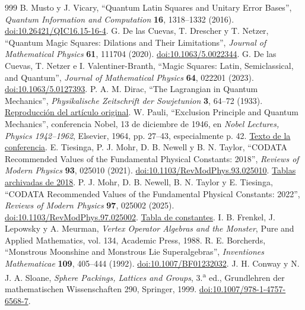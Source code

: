 \begin{thebibliography}{999}
 B. Musto y J. Vicary, ``Quantum Latin Squares and Unitary Error Bases'', \emph{Quantum Information and Computation} \textbf{16}, 1318--1332 (2016). \href{https://doi.org/10.26421/QIC16.15-16-4}{doi:10.26421/QIC16.15-16-4}.
 G. De las Cuevas, T. Drescher y T. Netzer, ``Quantum Magic Squares: Dilations and Their Limitations'', \emph{Journal of Mathematical Physics} \textbf{61}, 111704 (2020). \href{https://doi.org/10.1063/5.0022344}{doi:10.1063/5.0022344}.
 G. De las Cuevas, T. Netzer e I. Valentiner-Branth, ``Magic Squares: Latin, Semiclassical, and Quantum'', \emph{Journal of Mathematical Physics} \textbf{64}, 022201 (2023). \href{https://doi.org/10.1063/5.0127393}{doi:10.1063/5.0127393}.
 P. A. M. Dirac, ``The Lagrangian in Quantum Mechanics'', \emph{Physikalische Zeitschrift der Sowjetunion} \textbf{3}, 64--72 (1933). \href{https://www.informationphilosopher.com/solutions/scientists/dirac/Lagrangian_1933.pdf}{Reproducción del artículo original}.
 W. Pauli, ``Exclusion Principle and Quantum Mechanics'', conferencia Nobel, 13 de diciembre de 1946, en \emph{Nobel Lectures, Physics 1942--1962}, Elsevier, 1964, pp. 27--43, especialmente p. 42. \href{https://www.nobelprize.org/uploads/2018/06/pauli-lecture.pdf}{Texto de la conferencia}.
 E. Tiesinga, P. J. Mohr, D. B. Newell y B. N. Taylor, ``CODATA Recommended Values of the Fundamental Physical Constants: 2018'', \emph{Reviews of Modern Physics} \textbf{93}, 025010 (2021). \href{https://doi.org/10.1103/RevModPhys.93.025010}{doi:10.1103/RevModPhys.93.025010}. \href{https://physics.nist.gov/cuu/Constants/ArchiveASCII/allascii_2018.txt}{Tablas archivadas de 2018}.
 P. J. Mohr, D. B. Newell, B. N. Taylor y E. Tiesinga, ``CODATA Recommended Values of the Fundamental Physical Constants: 2022'', \emph{Reviews of Modern Physics} \textbf{97}, 025002 (2025). \href{https://doi.org/10.1103/RevModPhys.97.025002}{doi:10.1103/RevModPhys.97.025002}. \href{https://physics.nist.gov/cuu/Constants/Table/allascii.txt}{Tabla de constantes}.
 I. B. Frenkel, J. Lepowsky y A. Meurman, \emph{Vertex Operator Algebras and the Monster}, Pure and Applied Mathematics, vol. 134, Academic Press, 1988.
 R. E. Borcherds, ``Monstrous Moonshine and Monstrous Lie Superalgebras'', \emph{Inventiones Mathematicae} \textbf{109}, 405--444 (1992). \href{https://doi.org/10.1007/BF01232032}{doi:10.1007/BF01232032}.
 J. H. Conway y N. J. A. Sloane, \emph{Sphere Packings, Lattices and Groups}, 3.\textsuperscript{a} ed., Grundlehren der mathematischen Wissenschaften 290, Springer, 1999. \href{https://doi.org/10.1007/978-1-4757-6568-7}{doi:10.1007/978-1-4757-6568-7}.

\end{thebibliography}
